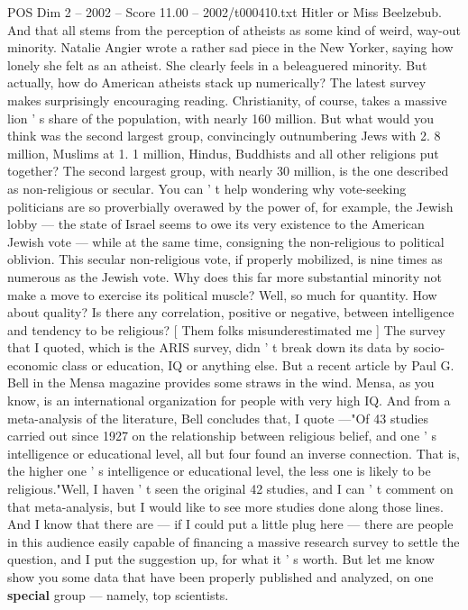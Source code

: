 \begin{textsample}{POS Dim 2 – 2002 – Score 11.00 – 2002/t000410.txt}
Hitler or Miss Beelzebub.
And that all stems from the perception of atheists as some kind of weird, way-out minority.
Natalie Angier wrote a rather sad piece in the New Yorker, saying how lonely she felt as an atheist.
She clearly feels in a beleaguered minority.
But actually, how do American atheists stack up numerically?
The latest survey makes surprisingly encouraging reading.
Christianity, of course, takes a massive lion ' s share of the population, with nearly 160 million.
But what would you think was the second largest group, convincingly outnumbering Jews with 2. 8 million, Muslims at 1. 1 million, Hindus, Buddhists and all other religions put together?
The second largest group, with nearly 30 million, is the one described as non-religious or secular.
You can ' t help wondering why vote-seeking politicians are so proverbially overawed by the power of, for example, the Jewish lobby — the state of Israel seems to owe its very existence to the American Jewish vote — while at the same time, consigning the non-religious to political oblivion.
This secular non-religious vote, if properly mobilized, is nine times as numerous as the Jewish vote.
Why does this far more substantial minority not make a move to exercise its political muscle?
Well, so much for quantity.
How about quality?
Is there any correlation, positive or negative, between intelligence and tendency to be religious? [ Them folks misunderestimated me ] The survey that I quoted, which is the ARIS survey, didn ' t break down its data by socio-economic class or education, IQ or anything else.
But a recent article by Paul G.
Bell in the Mensa magazine provides some straws in the wind.
Mensa, as you know, is an international organization for people with very high IQ.
And from a meta-analysis of the literature, Bell concludes that, I quote —"Of 43 studies carried out since 1927 on the relationship between religious belief, and one ' s intelligence or educational level, all but four found an inverse connection.
That is, the higher one ' s intelligence or educational level, the less one is likely to be religious."Well, I haven ' t seen the original 42 studies, and I can ' t comment on that meta-analysis, but I would like to see more studies done along those lines.
And I know that there are — if I could put a little plug here — there are people in this audience easily capable of financing a massive research survey to settle the question, and I put the suggestion up, for what it ' s worth.
But let me know show you some data that have been properly published and analyzed, on one \textbf{special} group — namely, top scientists.

\end{textsample}
